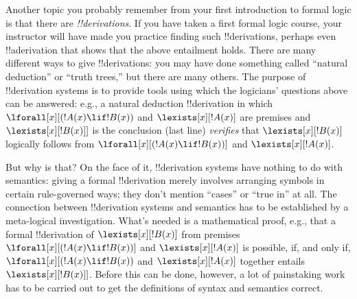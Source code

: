 \documentclass[../../../include/open-logic-section]{subfiles}
\begin{document}
Another topic you probably remember from your first introduction to
formal logic is that there are \emph{!!{derivation}s}.  If you have
taken a first formal logic course, your instructor will have made you
practice finding such !!{derivation}s, perhaps even !!a{derivation}
that shows that the above entailment holds.  There are many different
ways to give !!{derivation}s: you may have done something called
``natural deduction'' or ``truth trees,'' but there are many others.
The purpose of !!{derivation} systems is to provide tools using which the
logicians' questions above can be answered: e.g., a natural deduction
!!{derivation} in which $\lforall[x][(!A(x) \lif !B(x))$ and
$\lexists[x][!A(x)]$ are premises and $\lexists[x][!B(x)]]$ is the
conclusion (last line) \emph{verifies} that $\lexists[x][!B(x)]$
logically follows from $\lforall[x][(!A(x) \lif !B(x))]$ and
$\lexists[x][!A(x)]$.  

But why is that?  On the face of it, !!{derivation} systems have nothing to do
with semantics: giving a formal !!{derivation} merely involves arranging symbols
in certain rule-governed ways; they don't mention ``cases'' or ``true
in'' at all.  The connection between !!{derivation} systems and semantics has
to be established by a meta-logical investigation. What's needed is a
mathematical proof, e.g., that a formal !!{derivation} of $\lexists[x][!B(x)]$
from premises $\lforall[x][(!A(x) \lif !B(x))]$ and
$\lexists[x][!A(x)]$ is possible, if, and only if, $\lforall[x][(!A(x)
\lif !B(x))$ and $\lexists[x][!A(x)]$ together
entails~$\lexists[x][!B(x)]]$.  Before this can be done, however, a
lot of painstaking work has to be carried out to get the definitions
of syntax and semantics correct.
\end{document}
